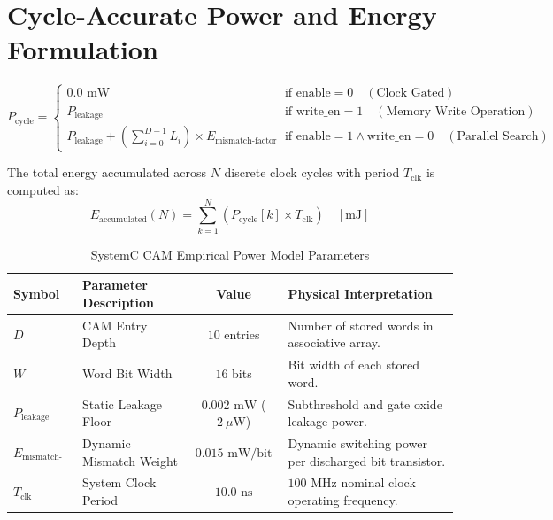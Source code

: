 \documentclass[11pt,a4paper,oneside]{report}
\begin{document}
\section{Cycle-Accurate Power and Energy Formulation}
\begin{mathbox}
\begin{equation}
\label{eq:power_formula}
P_{\text{cycle}} = \begin{cases}
0.0\text{ mW} & \text{if } \text{enable} = 0 \quad (\text{Clock Gated}) \\
P_{\text{leakage}} & \text{if } \text{write\_en} = 1 \quad (\text{Memory Write Operation}) \\
P_{\text{leakage}} + \left( \sum_{i=0}^{D-1} L_i \right) \times E_{\text{mismatch-factor}} & \text{if } \text{enable} = 1 \land \text{write\_en} = 0 \quad (\text{Parallel Search})
\end{cases}
\end{equation}

The total energy accumulated across $N$ discrete clock cycles with period $T_{\text{clk}}$ is computed as:
\begin{equation}
E_{\text{accumulated}}(N) = \sum_{k=1}^{N} \left( P_{\text{cycle}}[k] \times T_{\text{clk}} \right) \quad [\text{mJ}]
\end{equation}
\end{mathbox}

\begin{table}[h!]
\centering
\caption{SystemC CAM Empirical Power Model Parameters}
\label{tab:power_params}
\begin{tabularx}{\textwidth}{l p{4.2cm} c X}
\toprule
\textbf{Symbol} & \textbf{Parameter Description} & \textbf{Value} & \textbf{Physical Interpretation} \\
\midrule
$D$ & CAM Entry Depth & $10$ entries & Number of stored words in associative array. \\
$W$ & Word Bit Width & $16$ bits & Bit width of each stored word. \\
$P_{\text{leakage}}$ & Static Leakage Floor & $0.002\text{ mW}$ ($2\ \mu\text{W}$) & Subthreshold and gate oxide leakage power. \\
$E_{\text{mismatch-factor}}$ & Dynamic Mismatch Weight & $0.015\text{ mW/bit}$ & Dynamic switching power per discharged bit transistor. \\
$T_{\text{clk}}$ & System Clock Period & $10.0\text{ ns}$ & $100\text{ MHz}$ nominal clock operating frequency. \\
\bottomrule
\end{tabularx}
\end{table}
\end{document}
